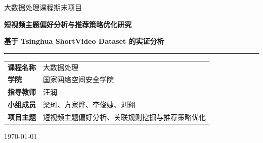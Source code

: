 \documentclass[UTF8,a4paper,12pt,fontset=none]{ctexart}
\begin{document}
\begin{titlepage}
\thispagestyle{empty}
\centering
\vspace*{1.7cm}
{\Large \textcolor{ThemeBlue}{大数据处理课程期末项目}\par}
\vspace{1.2cm}
{\Huge \bfseries 短视频主题偏好分析与推荐策略优化研究\par}
\vspace{0.35cm}
{\Large \bfseries 基于 Tsinghua ShortVideo Dataset 的实证分析\par}
\vspace{1.2cm}
\textcolor{ThemeBlue}{\rule{0.78\textwidth}{1.2pt}}
\vspace{1.5cm}

\begin{minipage}{0.84\textwidth}
\large
\begin{tabular}{>{\bfseries}p{3.1cm}p{9.3cm}}
课程名称 & 大数据处理 \\
学院 & 国家网络空间安全学院 \\
指导教师 & 汪润 \\
小组成员 & 梁珂、方家烨、李俊婕、刘翔 \\
项目主题 & 短视频主题偏好分析、关联规则挖掘与推荐策略优化 \\
\end{tabular}
\end{minipage}

\vfill
{\large \today\par}
\end{titlepage}

\begin{abstract}
短视频推荐系统面对的是高频曝光、弱反馈密集、内容主题多样的行为数据。课程项目围绕“如何从用户观看和互动行为中识别主题偏好，并将可解释的群体规律用于推荐排序”展开，基于 Tsinghua ShortVideo Dataset 的抽样交互数据，构建了从数据清洗、主题行为统计、用户主题画像、关联规则挖掘到推荐策略评估的完整流程。实验将原始多标签曝光记录聚合为用户-视频级交互，构造观看比例、有效观看、互动反馈和负反馈等特征，并按用户时间顺序划分训练集与测试集，避免偏好构建和规则挖掘阶段使用测试行为。推荐实验设置了两个可比较方案：baseline 只使用用户历史主题偏好和视频热门度，rule-enhanced 在此基础上引入分群主题成功率、关联规则质量、相似主题迁移、标签匹配和负反馈风险。实验结果显示，rule-enhanced 在 HitRate@10、Precision@10、Recall@10 和 ThemeMatch@10 上均超过 baseline，说明主题级规则和群体反馈可以为个体历史偏好提供有效补充。项目同时给出 Python 本地流水线、Spark 主题统计与 FP-Growth 实现、Hive 离线数仓 SQL，以及可复现的结果表和可视化图表。
\end{abstract}
\end{document}
